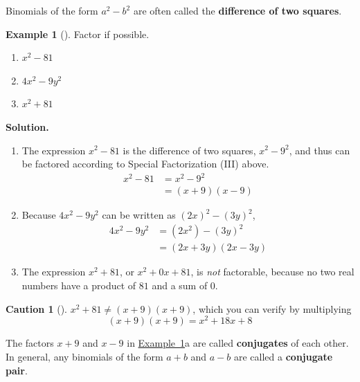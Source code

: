\documentclass[10pt,]{book}
\newcommand{\terminology}[1]{\textbf{#1}}
\theoremstyle{plain}
\theoremstyle{definition}
\newtheorem{warning}[theorem]{Caution}
\theoremstyle{definition}
\newtheorem{example}[theorem]{Example}
\theoremstyle{definition}
\numberwithin{equation}{part}
\newcommand{\amp}{&}
\begin{document}
\par
Binomials of the form \(a^2 − b^2\) are often called the \terminology{difference of two squares}.%
\begin{example}[]\label{factor-difference-of-squares}
Factor if possible. \leavevmode%
\begin{enumerate}[label=*\alph**]
\item\hypertarget{li-268}{}\(x^2 − 81\)%
\item\hypertarget{li-269}{}\(4x^2 − 9y^2\)%
\item\hypertarget{li-270}{}\(x^2 + 81\)%
\end{enumerate}
%
\par\medskip\noindent%
\textbf{Solution.}\quad \leavevmode%
\begin{enumerate}[label=*\alph**]
\item\hypertarget{li-271}{}The expression \(x^2 − 81\) is the difference of two squares, \(x^2 − 9^2\), and thus can be factored according to Special Factorization (III) above.%
\begin{align*}
x^2-81 \amp = x^2-9^2\\
\amp = (x+9)(x-9)
\end{align*}
%
\item\hypertarget{li-272}{}Because \(4x^2 − 9y^2\) can be written as \((2x)^2 −(3y)^2\),%
\begin{align*}
4x^2 − 9y^2 \amp =(2x^2)-(3y)^2 \\
\amp =(2x+3y)(2x-3y) 
\end{align*}
%
\item\hypertarget{li-273}{}The expression \(x^2 + 81\), or \(x^2 + 0x + 81\), is \emph{not} factorable, because no two real numbers have a product of \(81\) and a sum of \(0\).%
\end{enumerate}
%
\end{example}
\begin{warning}[]\label{warning-9}
\(x^2 + 81\ne (x + 9) (x + 9)\), which you can verify by multiplying%
\begin{equation*}
(x + 9) (x + 9) = x^2 + 18x + 8
\end{equation*}
%
\end{warning}
\par
The factors \(x + 9\) and \(x − 9\) in \hyperref[factor-difference-of-squares]{Example~\ref{factor-difference-of-squares}}a are called \terminology{conjugates} of each other. In general, any binomials of the form \(a+b\) and \(a-b\) are called a \terminology{conjugate pair}.%
\typeout{************************************************}
\typeout{************************************************}
\end{document}
